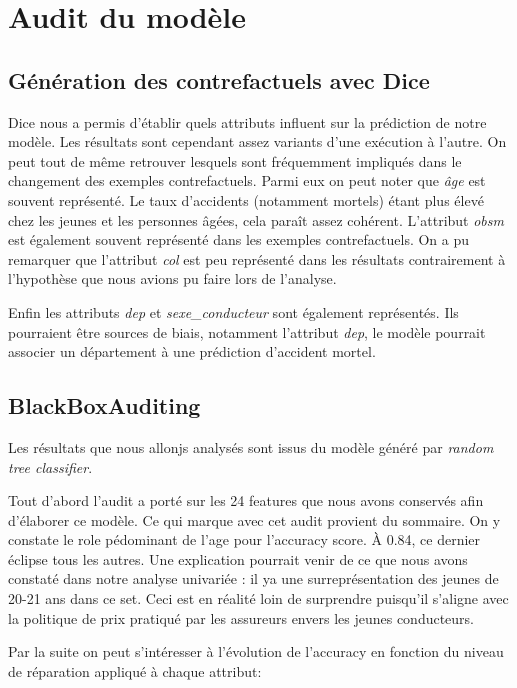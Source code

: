 \documentclass{article}
\begin{document}
    \section{Audit du modèle}

    \subsection{Génération des contrefactuels avec Dice}
    Dice nous a permis d'établir quels attributs influent sur la prédiction de notre modèle. Les résultats sont 
    cependant assez variants d'une exécution à l'autre. On peut tout de même retrouver lesquels sont fréquemment impliqués 
    dans le changement des exemples contrefactuels.
    Parmi eux on peut noter que \textit{âge} est souvent représenté. Le taux d'accidents (notamment mortels) étant plus 
    élevé chez les jeunes et les personnes âgées, cela paraît assez cohérent. L'attribut \textit{obsm} est également 
    souvent représenté dans les exemples contrefactuels.
    On a pu remarquer que l'attribut \textit{col} est peu représenté dans les résultats contrairement à l'hypothèse que 
    nous avions pu faire lors de l'analyse.
    
    Enfin les attributs \textit{dep} et \textit{sexe\_conducteur} sont également représentés. Ils pourraient être sources de biais, notamment 
    l'attribut \textit{dep}, le modèle pourrait associer un département à une prédiction d'accident mortel.


    \subsection{BlackBoxAuditing}
    Les résultats que nous allonjs analysés sont issus du modèle généré par \textit{random tree classifier}.

    Tout d'abord l'audit a porté sur les 24 features que nous avons conservés afin d'élaborer ce modèle. Ce qui marque avec 
    cet audit provient du sommaire. On y constate le role pédominant de l'age pour l'accuracy score. À 0.84, ce dernier éclipse 
    tous les autres. Une explication pourrait venir de ce que nous avons constaté dans notre analyse univariée : il ya une 
    surreprésentation des jeunes de 20-21 ans dans ce set. Ceci est en réalité loin de surprendre puisqu'il s'aligne avec la 
    politique de prix pratiqué par les assureurs envers les jeunes conducteurs.

    Par la suite on peut s'intéresser à l'évolution de l'accuracy en fonction du niveau de réparation appliqué à chaque 
    attribut: 
\end{document}
